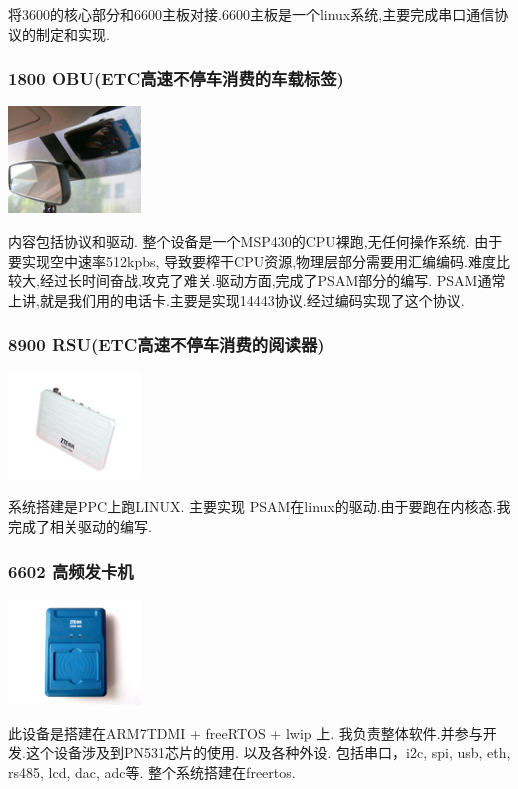 \documentclass[titlepage]{article}
\begin{document}
将3600的核心部分和6600主板对接.6600主板是一个linux系统,主要完成串口通信协议的制定和实现.

\subsubsection{1800 OBU(ETC高速不停车消费的车载标签)}

\includegraphics[width=100pt]{1800.png}

内容包括协议和驱动. 整个设备是一个MSP430的CPU裸跑,无任何操作系统. 由于要实现空中速率512kpbs, 导致要榨干CPU资源,物理层部分需要用汇编编码.难度比较大,经过长时间奋战,攻克了难关.驱动方面,完成了PSAM部分的编写. PSAM通常上讲,就是我们用的电话卡.主要是实现14443协议.经过编码实现了这个协议.

\subsubsection{8900 RSU(ETC高速不停车消费的阅读器)}
 
\includegraphics[width=100pt]{8900.png}

系统搭建是PPC上跑LINUX. 主要实现 PSAM在linux的驱动.由于要跑在内核态.我完成了相关驱动的编写.

\subsubsection{6602 高频发卡机}
 
\includegraphics[width=100pt]{6602.png}

此设备是搭建在ARM7TDMI + freeRTOS + lwip 上. 我负责整体软件.并参与开发.这个设备涉及到PN531芯片的使用. 以及各种外设. 包括串口，i2c, spi, usb, eth, rs485, lcd, dac, adc等. 整个系统搭建在freertos.
\end{document}
